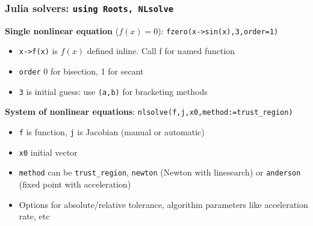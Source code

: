 \documentclass[bigger]{beamer}
\begin{document}
\begin{frame}%

\frametitle{Julia solvers: \texttt{using Roots, NLsolve}}

\textbf{Single nonlinear equation} ($f(x)=0$):\newline
\qquad \texttt{fzero(x->sin(x),3,order=1)}

\begin{itemize}

\item \texttt{x->f(x)} is $f(x)$ defined inline. Call f for named function

\item \texttt{order} 0 for bisection, 1 for secant 

\item \texttt{3} is initial guess: use \texttt{(a,b)} for bracketing methods

\end{itemize}


\textbf{System of nonlinear equations}:\newline
\qquad \texttt{nlsolve(f,j,x0,method:=trust\_region)}

\begin{itemize}

\item \texttt{f} is function, \texttt{j} is Jacobian (manual or automatic)
\item \texttt{x0} initial vector
\item \texttt{method} can be \texttt{trust\_region}, \texttt{newton} (Newton with linesearch) or \texttt{anderson} (fixed point with acceleration)
\item Options for absolute/relative tolerance, algorithm parameters like acceleration rate, etc

\end{itemize}



\end{frame}%
\end{document}
